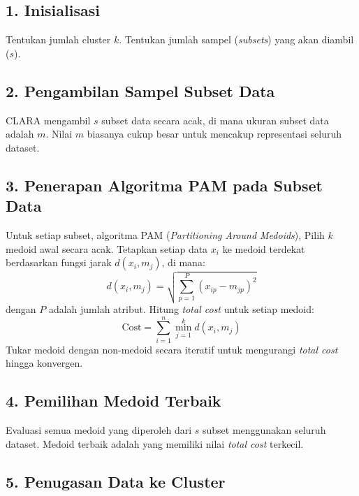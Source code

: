 \documentclass[
  oneside]{book}
\begin{document}
\subsection*{1. Inisialisasi}\label{inisialisasi}

Tentukan jumlah cluster \(k\). Tentukan jumlah sampel (\emph{subsets}) yang akan diambil (\(s\)).

\subsection*{2. Pengambilan Sampel Subset Data}\label{pengambilan-sampel-subset-data}

CLARA mengambil \(s\) subset data secara acak, di mana ukuran subset data adalah \(m\). Nilai \(m\) biasanya cukup besar untuk mencakup representasi seluruh dataset.

\subsection*{3. Penerapan Algoritma PAM pada Subset Data}\label{penerapan-algoritma-pam-pada-subset-data}

Untuk setiap subset, algoritma PAM (\emph{Partitioning Around Medoids}), Pilih \(k\) medoid awal secara acak. Tetapkan setiap data \(x_i\) ke medoid terdekat berdasarkan fungsi jarak \(d(x_i, m_j)\), di mana:
\[
     d(x_i, m_j) = \sqrt{\sum_{p=1}^P (x_{ip} - m_{jp})^2}
     \]
dengan \(P\) adalah jumlah atribut. Hitung \emph{total cost} untuk setiap medoid:
\[
     \text{Cost} = \sum_{i=1}^n \min_{j=1}^k d(x_i, m_j)
     \]
Tukar medoid dengan non-medoid secara iteratif untuk mengurangi \emph{total cost} hingga konvergen.

\subsection*{4. Pemilihan Medoid Terbaik}\label{pemilihan-medoid-terbaik}

Evaluasi semua medoid yang diperoleh dari \(s\) subset menggunakan seluruh dataset. Medoid terbaik adalah yang memiliki nilai \emph{total cost} terkecil.

\subsection*{5. Penugasan Data ke Cluster}\label{penugasan-data-ke-cluster}
\end{document}

